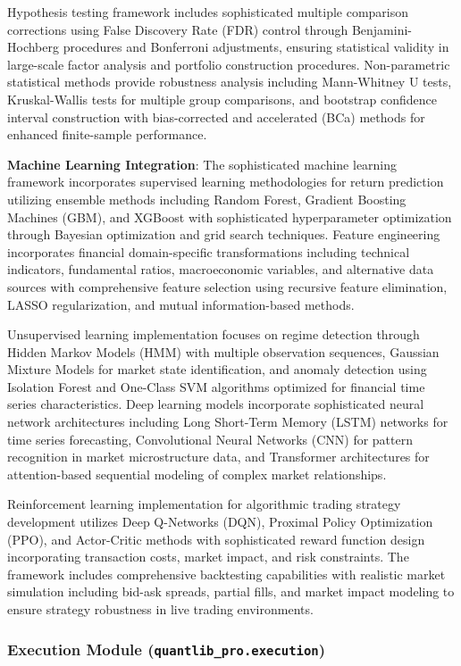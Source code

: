 \documentclass[12pt,a4paper]{article}
\theoremstyle{definition}
\theoremstyle{remark}
\begin{document}
Hypothesis testing framework includes sophisticated multiple comparison corrections using False Discovery Rate (FDR) control through Benjamini-Hochberg procedures and Bonferroni adjustments, ensuring statistical validity in large-scale factor analysis and portfolio construction procedures. Non-parametric statistical methods provide robustness analysis including Mann-Whitney U tests, Kruskal-Wallis tests for multiple group comparisons, and bootstrap confidence interval construction with bias-corrected and accelerated (BCa) methods for enhanced finite-sample performance.

\textbf{Machine Learning Integration}: The sophisticated machine learning framework incorporates supervised learning methodologies for return prediction utilizing ensemble methods including Random Forest, Gradient Boosting Machines (GBM), and XGBoost with sophisticated hyperparameter optimization through Bayesian optimization and grid search techniques. Feature engineering incorporates financial domain-specific transformations including technical indicators, fundamental ratios, macroeconomic variables, and alternative data sources with comprehensive feature selection using recursive feature elimination, LASSO regularization, and mutual information-based methods.

Unsupervised learning implementation focuses on regime detection through Hidden Markov Models (HMM) with multiple observation sequences, Gaussian Mixture Models for market state identification, and anomaly detection using Isolation Forest and One-Class SVM algorithms optimized for financial time series characteristics. Deep learning models incorporate sophisticated neural network architectures including Long Short-Term Memory (LSTM) networks for time series forecasting, Convolutional Neural Networks (CNN) for pattern recognition in market microstructure data, and Transformer architectures for attention-based sequential modeling of complex market relationships.

Reinforcement learning implementation for algorithmic trading strategy development utilizes Deep Q-Networks (DQN), Proximal Policy Optimization (PPO), and Actor-Critic methods with sophisticated reward function design incorporating transaction costs, market impact, and risk constraints. The framework includes comprehensive backtesting capabilities with realistic market simulation including bid-ask spreads, partial fills, and market impact modeling to ensure strategy robustness in live trading environments.

\subsubsection{Execution Module (\texttt{quantlib\_pro.execution})}
\end{document}
